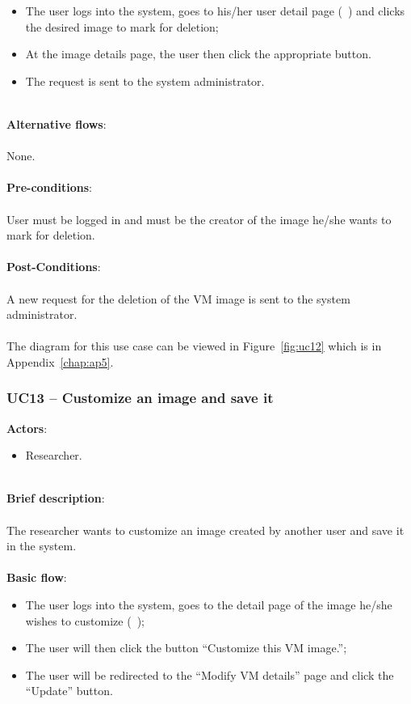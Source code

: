\begin{itemize}
\item The user logs into the system, goes to his/her user detail page (~) and clicks the desired image to mark for deletion;
\item At the image details page, the user then click the appropriate button.
\item The request is sent to the system administrator.
\end{itemize}

\ \\
\textbf{Alternative flows}:\\
\ \\
None.\\
\ \\
\textbf{Pre-conditions}:\\
\ \\
User must be logged in and must be the creator of the image he/she wants to mark for deletion.\\
\ \\
\textbf{Post-Conditions}:\\
\ \\
A new request for the deletion of the VM image is sent to the system administrator.\\
\ \\
The diagram for this use case can be viewed in Figure~\ref{fig:uc12} which is in Appendix~\ref{chap:ap5}.

\subsubsection{UC13 -- Customize an image and save it}\label{uc13}

\textbf{Actors}:

\begin{itemize}
\item Researcher.
\end{itemize}

\ \\
\textbf{Brief description}:\\
\ \\
The researcher wants to customize an image created by another user and save it in the system.\\
\ \\
\textbf{Basic flow}:

\begin{itemize}
\item The user logs into the system, goes to the detail page of the image he/she wishes to customize (~);
\item The user will then click the button ``Customize this VM image.'';
\item The user will be redirected to the ``Modify VM details'' page and click the ``Update'' button.
\end{itemize}

